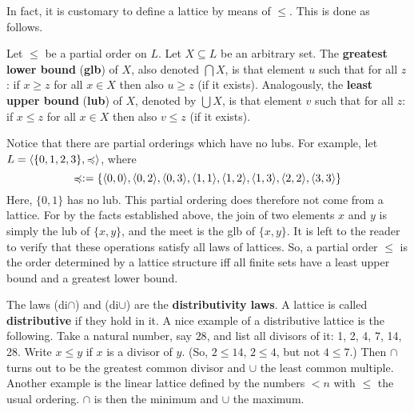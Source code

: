 In fact, it is customary to define a lattice by means of $\leq$.
This is done as follows.
\begin{defn}
Let $\leq $ be a partial order on $L$.  Let $X \subseteq L$ be an
arbitrary set. The \textbf{greatest lower bound} (\textbf{glb}) of 
$X$, also denoted $\bigcap X$, is that element $u$ such that for 
all $z$: if $x \geq z$ for all $x \in X$ then also $u \geq z$ (if it 
exists). Analogously, the \textbf{least upper bound} (\textbf{lub}) 
of $X$, denoted by $\bigcup X$, is that element $v$ such that for all
$z$: if $x \leq  z$ for all $x \in X$ then also $v \leq z$ (if it 
exists).
\end{defn}
Notice that there are partial orderings which have no lubs. For 
example, let $L = \langle \{0,1,2,3\}, \preccurlyeq\rangle$, where 
\begin{equation}
\preccurlyeq := \{\langle 0,0\rangle, \langle 0,2\rangle, \langle 0,3\rangle, 
	\langle 1,1\rangle, \langle 1,2\rangle, \langle 1,3\rangle, \langle 2,2\rangle, 
	\langle 3,3\rangle\}
\end{equation}
Here, $\{0,1\}$ has no lub. This partial ordering does therefore 
not come from a lattice. For 
by the facts established above, the join of two elements
$x$ and $y$ is simply the lub of $\{x, y\}$, and the
meet is the glb of $\{x, y\}$. It is left to the reader to
verify that these operations satisfy all laws of lattices.
So, a partial order $\leq$ is the order determined by a lattice
structure iff all finite sets have a least upper
bound and a greatest lower bound.

The laws (di$\cap$) and (di$\cup$) are the \textbf{distributivity
laws}. A lattice is called \textbf{distributive} if they hold in it.
A nice example of a distributive lattice is the following. Take
a natural number, say $28$, and list all divisors of it:
1, 2, 4, 7, 14, 28. Write $x \leq y$ if $x$ is a
divisor of $y$. (So, $2 \leq 14$, $2 \leq 4$, but not $4 \leq 7$.)
Then $\cap$ turns out to be the greatest common divisor and
$\cup$ the least common multiple. Another example is the
linear lattice defined by the numbers $< n$ with $\leq$ the
usual ordering. $\cap$ is then the minimum and $\cup$ the
maximum.

